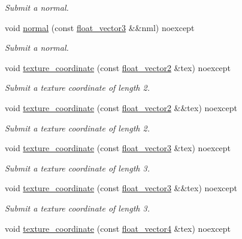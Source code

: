 \begin{DoxyCompactItemize}
\begin{DoxyCompactList}\small\item\em Submit a normal. \end{DoxyCompactList}\item 
void \hyperlink{namespaceglpp_a9a86b5d9e2e3e536e0c0f514017e943c}{normal} (const \hyperlink{namespaceglpp_a3fa7b207a8b7dba583fb22731a616d73}{float\+\_\+vector3} \&\&nml) noexcept
\begin{DoxyCompactList}\small\item\em Submit a normal. \end{DoxyCompactList}\item 
void \hyperlink{namespaceglpp_afa497f581263758c5e194771502a15b9}{texture\+\_\+coordinate} (const \hyperlink{namespaceglpp_ace2f7da7495fc7d1623d97a444c87146}{float\+\_\+vector2} \&tex) noexcept
\begin{DoxyCompactList}\small\item\em Submit a texture coordinate of length 2. \end{DoxyCompactList}\item 
void \hyperlink{namespaceglpp_a5bd5c10e292b241cd3a73243cd2e3bd6}{texture\+\_\+coordinate} (const \hyperlink{namespaceglpp_ace2f7da7495fc7d1623d97a444c87146}{float\+\_\+vector2} \&\&tex) noexcept
\begin{DoxyCompactList}\small\item\em Submit a texture coordinate of length 2. \end{DoxyCompactList}\item 
void \hyperlink{namespaceglpp_af144ad1b5dae895e0a5a57f3660d1eaa}{texture\+\_\+coordinate} (const \hyperlink{namespaceglpp_a3fa7b207a8b7dba583fb22731a616d73}{float\+\_\+vector3} \&tex) noexcept
\begin{DoxyCompactList}\small\item\em Submit a texture coordinate of length 3. \end{DoxyCompactList}\item 
void \hyperlink{namespaceglpp_a4a42134248c8e5bba26f7edebc610649}{texture\+\_\+coordinate} (const \hyperlink{namespaceglpp_a3fa7b207a8b7dba583fb22731a616d73}{float\+\_\+vector3} \&\&tex) noexcept
\begin{DoxyCompactList}\small\item\em Submit a texture coordinate of length 3. \end{DoxyCompactList}\item 
void \hyperlink{namespaceglpp_aba5392bc48fea13c11e7e33251a178df}{texture\+\_\+coordinate} (const \hyperlink{namespaceglpp_ab4a3d7b8ed8e2e4810006eef5213a460}{float\+\_\+vector4} \&tex) noexcept

\end{DoxyCompactItemize}
